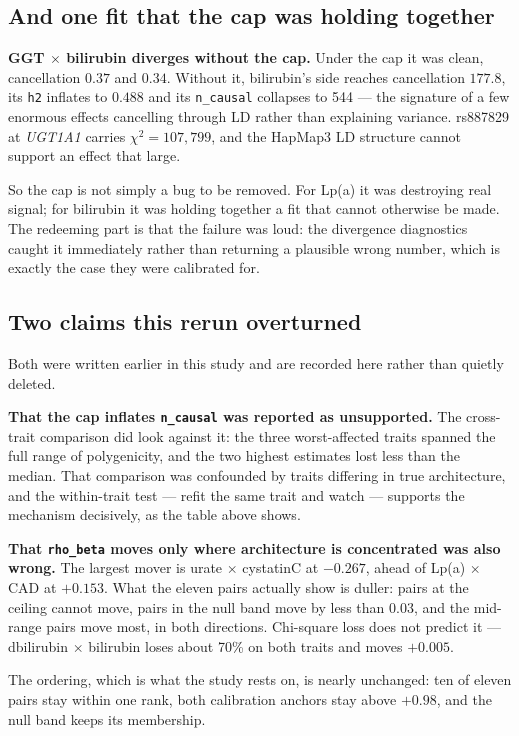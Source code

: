 \subsection*{And one fit that the cap was holding together}

\textbf{GGT $\times$ bilirubin diverges without the cap.} Under the cap it was
clean, cancellation $0.37$ and $0.34$. Without it, bilirubin's side reaches
cancellation $177.8$, its \texttt{h2} inflates to $0.488$ and its
\texttt{n\_causal} collapses to 544 --- the signature of a few enormous effects
cancelling through LD rather than explaining variance. rs887829 at \emph{UGT1A1}
carries $\chi^2 = 107{,}799$, and the HapMap3 LD structure cannot support an
effect that large.

So the cap is not simply a bug to be removed. For Lp(a) it was destroying real
signal; for bilirubin it was holding together a fit that cannot otherwise be
made. The redeeming part is that the failure was loud: the divergence
diagnostics caught it immediately rather than returning a plausible wrong
number, which is exactly the case they were calibrated for.

\subsection*{Two claims this rerun overturned}

Both were written earlier in this study and are recorded here rather than
quietly deleted.

\textbf{That the cap inflates \texttt{n\_causal} was reported as unsupported.}
The cross-trait comparison did look against it: the three worst-affected traits
spanned the full range of polygenicity, and the two highest estimates lost less
than the median. That comparison was confounded by traits differing in true
architecture, and the within-trait test --- refit the same trait and watch ---
supports the mechanism decisively, as the table above shows.

\textbf{That \texttt{rho\_beta} moves only where architecture is concentrated
was also wrong.} The largest mover is urate $\times$ cystatinC at $-0.267$,
ahead of Lp(a) $\times$ CAD at $+0.153$. What the eleven pairs actually show is
duller: pairs at the ceiling cannot move, pairs in the null band move by less
than $0.03$, and the mid-range pairs move most, in both directions. Chi-square
loss does not predict it --- dbilirubin $\times$ bilirubin loses about 70\% on
both traits and moves $+0.005$.

The ordering, which is what the study rests on, is nearly unchanged: ten of
eleven pairs stay within one rank, both calibration anchors stay above $+0.98$,
and the null band keeps its membership.
